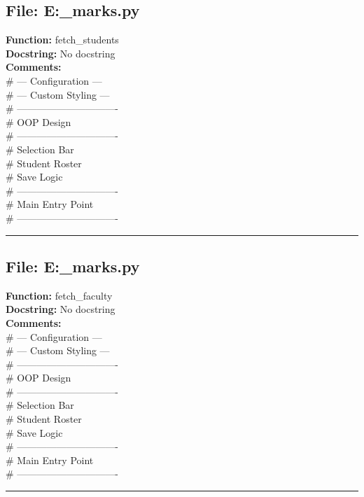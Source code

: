 {\subsection*{File: E:\project\capstone\frontend\faculty\assignment_marks.py}
\textbf{Function:} fetch_students\\
\textbf{Docstring:} No docstring\\
\textbf{Comments:}\\
# --- Configuration ---\\
# --- Custom Styling ---\\
# -------------------------------\\
# OOP Design\\
# -------------------------------\\
# Selection Bar\\
# Student Roster\\
# Save Logic\\
# -------------------------------\\
# Main Entry Point\\
# -------------------------------\\

\hrule

\subsection*{File: E:\project\capstone\frontend\faculty\assignment_marks.py}
\textbf{Function:} fetch_faculty\\
\textbf{Docstring:} No docstring\\
\textbf{Comments:}\\
# --- Configuration ---\\
# --- Custom Styling ---\\
# -------------------------------\\
# OOP Design\\
# -------------------------------\\
# Selection Bar\\
# Student Roster\\
# Save Logic\\
# -------------------------------\\
# Main Entry Point\\
# -------------------------------\\

\hrule

}
